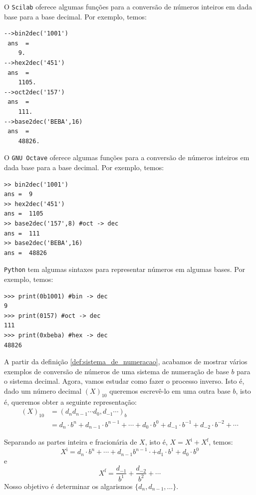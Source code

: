 \ifisscilab
\begin{obs}
  O \verb+Scilab+ oferece algumas funções para a conversão de números inteiros em dada base para a base decimal. Por exemplo, temos:
\begin{verbatim}
-->bin2dec('1001')
 ans  =
    9.  
-->hex2dec('451')
 ans  =
    1105.  
-->oct2dec('157')
 ans  =
    111.
-->base2dec('BEBA',16)
 ans  =
    48826.  
\end{verbatim}
\end{obs}
\fi
\ifisoctave
\begin{obs}
  O \verb+GNU Octave+ oferece algumas funções para a conversão de números inteiros em dada base para a base decimal. Por exemplo, temos:
\begin{verbatim}
>> bin2dec('1001')
ans =  9
>> hex2dec('451')
ans =  1105
>> base2dec('157',8) #oct -> dec
ans =  111
>> base2dec('BEBA',16)
ans =  48826
\end{verbatim}
\end{obs}
\fi
\ifispython
\begin{obs}
  \verb+Python+ tem algumas sintaxes para representar números em algumas bases. Por exemplo, temos:
\begin{verbatim}
>>> print(0b1001) #bin -> dec
9
>>> print(0157) #oct -> dec
111
>>> print(0xbeba) #hex -> dec
48826
\end{verbatim}
\end{obs}
\fi

A partir da definição \ref{def:sistema_de_numeracao}, acabamos de mostrar vários exemplos de conversão de números de uma sistema de numeração de base $b$ para o sistema decimal. Agora, vamos estudar como fazer o processo inverso. Isto é, dado um número decimal $(X)_{10}$ queremos escrevê-lo em uma outra base $b$, isto é, queremos obter a seguinte representação:
\begin{equation*}
  \begin{split}
    (X)_{10} &= (d_nd_{n-1}\cdots d_0,d_{-1}\cdots)_{b} \\
    &= d_n\cdot b^{n}+d_{n-1}\cdot b^{n-1}+\cdots + d_0\cdot b^0+d_{-1}\cdot b^{-1}+d_{-2}\cdot b^{-2}+\cdots          
  \end{split}
\end{equation*}

Separando as partes inteira e fracionária de $X$, isto é, $X = X^{\mbox{i}} + X^{\mbox{f}}$, temos:
\begin{equation*}
X^{\mbox{i}} = d_n\cdot b^{n}+ \cdots+d_{n-1}b^{n-1} \cdot  +d_1\cdot b^1 +d_0\cdot b^0
\end{equation*}
e
\begin{equation*}
  X^{\mbox{f}} = \frac{d_{-1}}{b^1} + \frac{d_{-2}}{b^{2}} + \cdots
\end{equation*}
Nosso objetivo é determinar os algarismos $\{d_n, d_{n-1}, ...\}$. 

